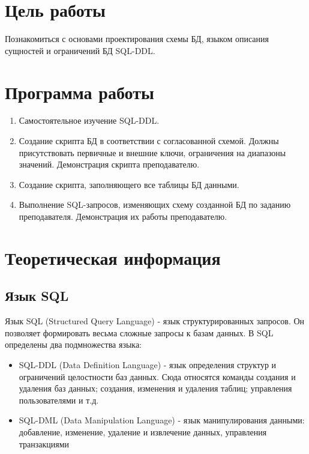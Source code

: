 
\usepackage{minted}




\newpage
\setcounter{page}{2}



\section{Цель работы}
Познакомиться с основами проектирования схемы БД, языком описания сущностей и ограничений БД SQL-DDL.

\section{Программа работы}
	\begin {enumerate}
	\item Самостоятельное изучение SQL-DDL.
	\item Создание скрипта БД в соответствии с согласованной схемой. Должны присутствовать первичные и внешние ключи, ограничения на диапазоны значений. Демонстрация скрипта преподавателю. 
	\item Создание скрипта, заполняющего все таблицы БД данными.
	\item Выполнение SQL-запросов, изменяющих схему созданной БД по заданию преподавателя. Демонстрация их работы преподавателю.
	\end {enumerate}

\section{Теоретическая информация}

\subsection{Язык SQL}
Язык SQL (Structured Query Language) - язык структурированных запросов. Он позволяет формировать весьма сложные запросы к базам данных. В SQL определены два подмножества языка:
\begin {itemize}
	\item SQL-DDL (Data Definition Language) - язык определения структур и ограничений целостности баз данных. Сюда относятся команды создания и удаления баз данных; создания, изменения и удаления таблиц; управления пользователями и т.д.
	\item SQL-DML (Data Manipulation Language) - язык манипулирования данными: добавление, изменение, удаление и извлечение данных, управления транзакциями
\end {itemize}

